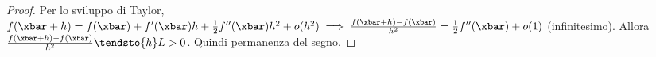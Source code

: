 \documentclass[11pt]{article}
\begin{document}
	\begin{proof}
		Per lo sviluppo di Taylor, $f(\xbar + h) = f(\xbar) + f'(\xbar) h + \frac{1}{2} f''(\xbar) h^2 + o(h^2) \implies \frac{f(\xbar + h) - f(\xbar)}{h^2} = \frac{1}{2} f''(\xbar) + o(1)$ (infinitesimo).
		Allora $\frac{f(\xbar + h) - f(\xbar)}{h^2} \tendsto{h} L > 0$.
		Quindi permanenza del segno.
	\end{proof}
\end{document}
